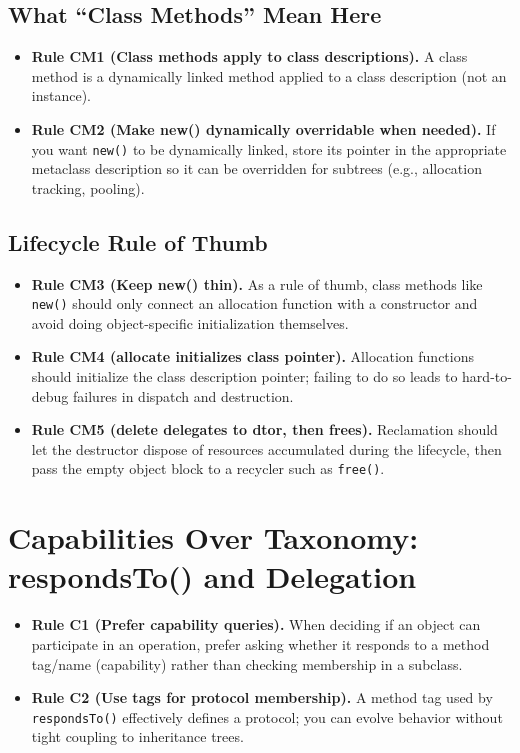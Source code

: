 \documentclass[11pt]{article}
\begin{document}
\subsection{What ``Class Methods'' Mean Here}

\begin{itemize}
  \item \textbf{Rule CM1 (Class methods apply to class descriptions).} A class method is a dynamically linked method applied to a class description (not an instance).
  \item \textbf{Rule CM2 (Make new() dynamically overridable when needed).} If you want \texttt{new()} to be dynamically linked, store its pointer in the appropriate metaclass description so it can be overridden for subtrees (e.g., allocation tracking, pooling).
\end{itemize}

\subsection{Lifecycle Rule of Thumb}

\begin{itemize}
  \item \textbf{Rule CM3 (Keep new() thin).} As a rule of thumb, class methods like \texttt{new()} should only connect an allocation function with a constructor and avoid doing object-specific initialization themselves.
  \item \textbf{Rule CM4 (allocate initializes class pointer).} Allocation functions should initialize the class description pointer; failing to do so leads to hard-to-debug failures in dispatch and destruction.
  \item \textbf{Rule CM5 (delete delegates to dtor, then frees).} Reclamation should let the destructor dispose of resources accumulated during the lifecycle, then pass the empty object block to a recycler such as \texttt{free()}.
\end{itemize}

\section{Capabilities Over Taxonomy: respondsTo() and Delegation}

\begin{itemize}
  \item \textbf{Rule C1 (Prefer capability queries).} When deciding if an object can participate in an operation, prefer asking whether it responds to a method tag/name (capability) rather than checking membership in a subclass.
  \item \textbf{Rule C2 (Use tags for protocol membership).} A method tag used by \texttt{respondsTo()} effectively defines a protocol; you can evolve behavior without tight coupling to inheritance trees.
\end{itemize}
\end{document}
